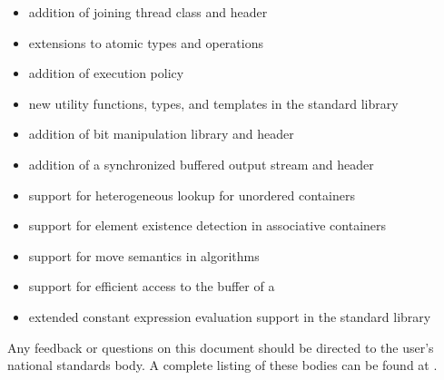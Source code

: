\begin{itemize}
\item addition of joining thread class and  header
\item extensions to atomic types and operations
\item addition of  execution policy
\item new utility functions, types, and templates in the standard library
\item addition of bit manipulation library and  header
\item addition of a synchronized buffered output stream and  header
\item support for heterogeneous lookup for unordered containers
\item support for element existence detection in associative containers
\item support for move semantics in  algorithms
\item support for efficient access to the buffer of a 
\item extended constant expression evaluation support in the standard library
\end{itemize}

Any feedback or questions on this document
should be directed to the user's national standards body.
A complete listing of these bodies can be found at
\href{http://www.iso.org/members.html}{}.

